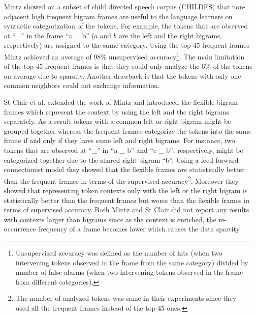 Mintz  showed on a subset of child
directed speech corpus (CHILDES) \cite{macwhinney2000childes} that
non-adjacent high frequent bigram frames are useful to the language
learners on syntactic categorization of the tokens.  For example, the
tokens that are observed at ``\_'' in the frame ``a \_ b'' ($a$ and
$b$ are the left and the right bigrams, respectively) are assigned to
the same category.  Using the top-45 frequent frames Mintz achieved an
average of 98\% unsupervised accuracy\footnote{Unsupervised accuracy
  was defined as the number of hits (when two intervening tokens
  observed in the frame from the same category) divided by number of
  false alarms (when two intervening tokens observed in the frame from
  different categories).}.  The main limitation of the top-45 frequent
frames is that they could only analyze the 6\% of the tokens on
average due to sparsity.  Another drawback is that the tokens with
only one common neighbors could not exchange information.

St Clair et al.   extended the work of Mintz
 and introduced the flexible bigram
frames which represent the context by using the left and the right
bigrams separately.  As a result tokens with a common left or right
bigram might be grouped together whereas the frequent frames
categorize the tokens into the same frame if and only if they have
same left and right bigrams.  For instance, two tokens that are
observed at ``\_'' in ``a \_ b'' and ``c \_ b'', respectively, might
be categorized together due to the shared right bigram ``b''.  Using a
feed forward connectionist model they showed that the flexible frames
are statistically better than the frequent frames in terms of the
supervised accuracy\footnote{The number of analyzed tokens was same in
  their experiments since they used all the frequent frames instead of
  the top-45 ones.}.  Moreover they showed that representing token
contexts only with the left or the right bigram is statistically
better than the frequent frames but worse than the flexible frames in
terms of supervised accuracy.  Both Mintz
 and St Clair  did
not report any results with contexts larger than bigrams since as the
context is enriched, the re-occurrence frequency of a frame becomes
lower which causes the data sparsity \cite{manning99foundations}.

